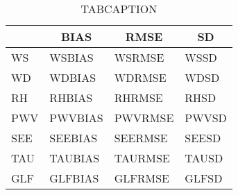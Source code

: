 \newpage
\begin{table}[]
\begin{center}
\begin{tabular}{|l|l|l|l|}
\hline
                            & \multicolumn{1}{c|}{\cellcolor[HTML]{C0C0C0}\textbf{BIAS}} & \multicolumn{1}{c|}{\cellcolor[HTML]{C0C0C0}\textbf{RMSE}} & \multicolumn{1}{c|}{\cellcolor[HTML]{C0C0C0}\textbf{SD}} \\\hline
\cellcolor[HTML]{C0C0C0}WS  & WSBIAS                                & WSRMSE                                & WSSD                                \\
\cellcolor[HTML]{C0C0C0}WD  & WDBIAS                                & WDRMSE                                & WDSD                                \\
\cellcolor[HTML]{C0C0C0}RH  & RHBIAS                                & RHRMSE                                & RHSD                                \\
\cellcolor[HTML]{C0C0C0}PWV & PWVBIAS                               & PWVRMSE                               & PWVSD                               \\
\cellcolor[HTML]{C0C0C0}SEE & SEEBIAS                               & SEERMSE                               & SEESD                               \\
\cellcolor[HTML]{C0C0C0}TAU & TAUBIAS                               & TAURMSE                               & TAUSD                               \\
\cellcolor[HTML]{C0C0C0}GLF & GLFBIAS                               & GLFRMSE                               & GLFSD                               \\
\hline
\end{tabular}
\caption{TABCAPTION}
\end{center}
\end{table}
